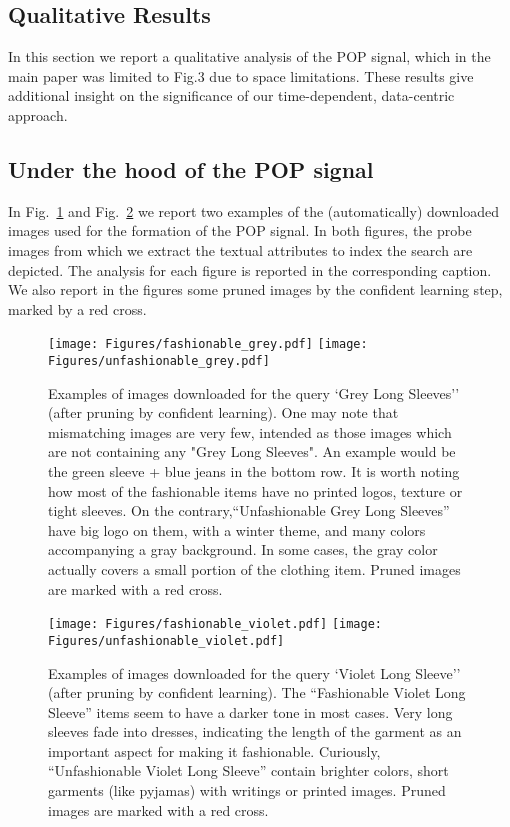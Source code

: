 \documentclass[runningheads]{llncs}
\newcommand{\snamebig}[0] {POP\xspace}
\begin{document}
\subsection{Qualitative Results}\label{sec:qualitative}

In this section we report a qualitative analysis of the POP signal, which in the main paper was limited to Fig.3 due to space limitations. These results give additional insight on the significance of our time-dependent, data-centric approach.

\subsection{Under the hood of the POP signal}
In Fig.~\ref{fig:grey} and Fig.~\ref{fig:viol} we report two examples of the (automatically) downloaded images used for the formation of the \snamebig signal. In both figures, the probe images from which we extract the textual attributes to index the search are depicted. The analysis for each figure is reported in the corresponding caption. We also report in the figures some pruned images by the confident learning step, marked by a red cross. 

\begin{figure}[t!]
    \begin{center}
        \texttt{[image: Figures/fashionable\_grey.pdf]}
        \texttt{[image: Figures/unfashionable\_grey.pdf]}
    \end{center}
    \caption{Examples of images downloaded for the query `Grey Long Sleeves'' (after pruning by confident learning). One may note that mismatching images are very few, intended as those images which are not containing any "Grey Long Sleeves". An example would be the green sleeve + blue jeans in the bottom row. It is worth noting how most of the fashionable items have no printed logos, texture or tight sleeves. On the contrary,``Unfashionable Grey Long Sleeves'' have big logo on them, with a winter theme, and many colors accompanying a gray background. In some cases, the gray color actually covers a small portion of the clothing item. Pruned images are marked with a red cross.}
    \label{fig:grey}
\end{figure}
\begin{figure}[]
    \begin{center}
        \texttt{[image: Figures/fashionable\_violet.pdf]}
        \texttt{[image: Figures/unfashionable\_violet.pdf]}
    \end{center}
    \caption{Examples of images downloaded for the query `Violet Long Sleeve'' (after pruning by confident learning). The ``Fashionable Violet Long Sleeve'' items seem to have a darker tone in most cases. Very long sleeves fade into dresses, indicating the length of the garment as an important aspect for making it fashionable. Curiously, ``Unfashionable Violet Long Sleeve'' contain brighter colors, short garments (like pyjamas) with writings or printed images. Pruned images are marked with a red cross.}
    \label{fig:viol}
\end{figure}
\end{document}

